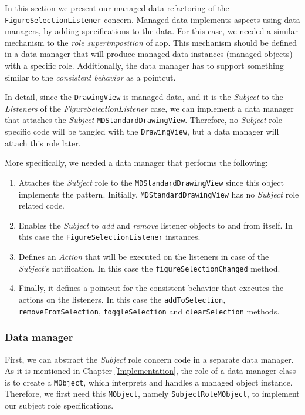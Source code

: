 In this section we present our managed data refactoring of the \texttt{FigureSelectionListener} concern.
Managed data implements aspects using data managers, by adding specifications to the data.
For this case, we needed a similar mechanism to the \textit{role superimposition} of \ac{aop}.
This mechanism should be defined in a data manager that will produce managed data instances (managed objects) with a specific role.
Additionally, the data manager has to support something similar to the \textit{consistent behavior} as a pointcut.

In detail, since the \texttt{DrawingView} is managed data, and it is the \textit{Subject} to the \textit{Listeners} of the \textit{FigureSelectionListener} case, we can implement a data manager that attaches the \textit{Subject} \texttt{MDStandardDrawingView}.
Therefore, no \textit{Subject} role specific code will be tangled with the \texttt{DrawingView}, but a data manager will attach this role later.

More specifically, we needed a data manager that performs the following:

\begin{enumerate}
	\item Attaches the \textit{Subject} role to the \texttt{MDStandardDrawingView} since this object implements the pattern.
	Initially, \texttt{MDStandardDrawingView} has no \textit{Subject} role related code.

	\item Enables the \textit{Subject} to \textit{add} and \textit{remove} listener objects to and from itself. 
	\newline
	In this case the \texttt{FigureSelectionListener} instances.

	\item Defines an \textit{Action} that will be executed on the listeners in case of the \textit{Subject}'s notification.
	\newline
	In this case the \texttt{figureSelectionChanged} method.

	\item Finally, it defines a pointcut for the consistent behavior that executes the actions on the listeners. 
	In this case the \texttt{addToSelection}, \texttt{removeFromSelection}, \texttt{toggleSelection} and \texttt{clearSelection} methods.
\end{enumerate}

\subsubsection{Data manager}
First, we can abstract the \textit{Subject} role concern code in a separate data manager.
As it is mentioned in Chapter \ref{Implementation}, the role of a data manager class is to create a \texttt{MObject}, which interprets and handles a managed object instance.
Therefore, we first need this \texttt{MObject}, namely \texttt{SubjectRoleMObject}, to implement our subject role specifications.

